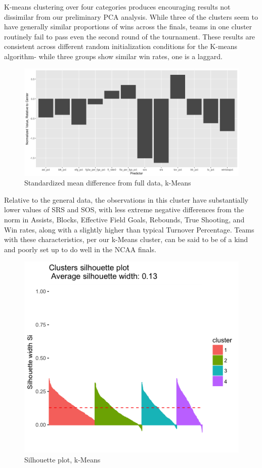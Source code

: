 \documentclass[10pt,a4paper, hidelinks]{article} %
\begin{document}
K-means clustering over four categories produces encouraging results not dissimilar from our preliminary PCA analysis.  While three of the clusters seem to have generally similar proportions of wins across the finals, teams in one cluster routinely fail to pass even the second round of the tournament.  These results are consistent across different random initialization conditions for the K-means algorithm- while three groups show similar win rates, one is a laggard.

\begin{figure}[H]
	\centering
	\includegraphics[width=0.7\linewidth]{../fig/weakclusterk}
		\caption{Standardized mean difference from full data, k-Means}
\end{figure}

Relative to the general data, the observations in this cluster have substantially lower values of SRS and SOS, with less extreme negative differences from the norm in Assists, Blocks, Effective Field Goals, Rebounds, True Shooting, and Win rates, along with a slightly higher than typical Turnover Percentage.  Teams with these characteristics, per our k-Means cluster, can be said to be of a kind and poorly set up to do well in the NCAA finals.

\begin{figure}[H]
	\centering
	\includegraphics[width=0.7\linewidth]{../fig/kmeansil}
		\caption{Silhouette plot, k-Means}
\end{figure}
\end{document}

